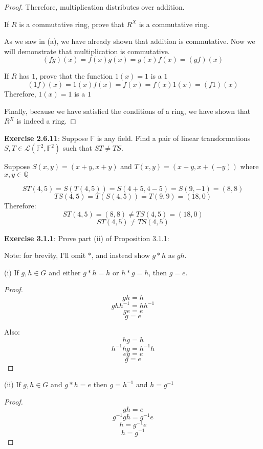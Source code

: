 \documentclass[a4paper]{article}
\begin{document}
\begin{myparindent}{0pt}
\begin{proof}
  Therefore, multiplication distributes over addition. \newline

If $R$ is a commutative ring, prove that $R^X$ is a commutative ring. \newline

  As we saw in (a), we have already shown that addition is commutative. Now
  we will demonstrate that multiplication is commutative.
  \[ (fg)(x) = f(x) g(x) = g(x) f(x) = (gf)(x) \] \newline

If $R$ has $1$, prove that the function $1(x) = 1$ is a $1$ \newline
  \[ (1f)(x) = 1(x) f(x) = f(x) = f(x) 1(x) = (f1)(x) \]
  Therefore, $1(x) = 1$ is a $1$ \newline

  Finally, because we have satisfied the conditions of a ring, we have shown
  that $R^X$ is indeed a ring.
\end{proof}

\textbf{Exercise 2.6.11}:
Suppose $\mathbb{F}$ is any field. Find a pair of linear transformations
$S, T \in \mathcal{L}(\mathbb{F}^2, \mathbb{F}^2)$ such that $ST \neq TS$.
\newline

Suppose $S(x, y) = (x + y, x + y)$ and $T(x, y) = (x + y, x + (-y))$
where $x, y \in \mathbb{Q}$

\[ ST(4, 5) = S(T(4, 5)) = S(4 + 5, 4 - 5) = S(9, -1) = (8, 8) \]
\[ TS(4, 5) = T(S(4, 5)) = T(9, 9) = (18, 0) \]
Therefore:
\[ ST(4, 5) = (8, 8) \neq TS(4, 5) = (18, 0) \]
\[ ST(4, 5) \neq TS(4, 5) \]

\textbf{Exercise 3.1.1}:
Prove part (ii) of Proposition 3.1.1: \newline

Note: for brevity, I'll omit $*$, and instead show $g * h$ as $gh$.

(i) If $g, h \in G$ and either $g * h = h$ or $h * g = h$, then $g = e$.
\begin{proof}
  \[ gh = h \]
  \[ ghh^{-1} = hh^{-1} \]
  \[ ge = e \]
  \[ g = e \]

  Also:
  \[ hg = h \]
  \[ h^{-1}hg = h^{-1}h \]
  \[ eg = e \]
  \[ g = e \]

\end{proof}

(ii) If $g, h \in G$ and $g * h = e$ then $g = h^{-1}$ and $h = g^{-1}$
\begin{proof}
  \[ gh = e \]
  \[ g^{-1}gh = g^{-1}e \]
  \[ h = g^{-1}e \]
  \[ h = g^{-1} \]


\end{proof}
\end{myparindent}
\end{document}

